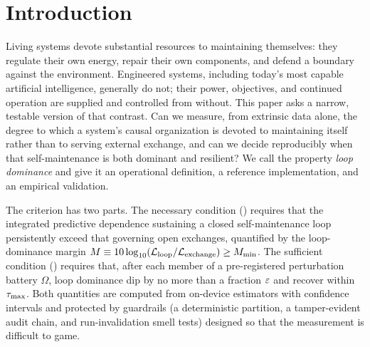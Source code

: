 \documentclass[11pt]{article}
\begin{document}
\begin{abstract}
These results establish loop dominance as a measurable, falsifiable property of a dynamical system and provide a tested, open instrument for evaluating it. The measure can be adopted on those terms alone. The criterion originated in the Loop-Dominance Theory of Consciousness (LDTC), the conjecture that this organization bears on the physical conditions for consciousness. That reading remains motivation rather than result; we treat it as an open interpretive question (), and nothing in this paper claims that any measured system is conscious. Code and data to reproduce every figure and table are released openly.
\end{abstract}

\section{Introduction}
\label{sec:intro}

Living systems devote substantial resources to maintaining themselves: they regulate their own energy, repair their own components, and defend a boundary against the environment. Engineered systems, including today's most capable artificial intelligence, generally do not; their power, objectives, and continued operation are supplied and controlled from without. This paper asks a narrow, testable version of that contrast. Can we measure, from extrinsic data alone, the degree to which a system's causal organization is devoted to maintaining itself rather than to serving external exchange, and can we decide reproducibly when that self-maintenance is both dominant and resilient? We call the property \emph{loop dominance} and give it an operational definition, a reference implementation, and an empirical validation.

The criterion has two parts. The necessary condition (\NC) requires that the integrated predictive dependence sustaining a closed self-maintenance loop persistently exceed that governing open exchanges, quantified by the loop-dominance margin $M \equiv 10\log_{10}(\mathcal{L}_{\text{loop}}/\mathcal{L}_{\text{exchange}}) \geq M_{\min}$. The sufficient condition (\SC) requires that, after each member of a pre-registered perturbation battery $\Omega$, loop dominance dip by no more than a fraction $\varepsilon$ and recover within $\tau_{\max}$. Both quantities are computed from on-device estimators with confidence intervals and protected by guardrails (a deterministic partition, a tamper-evident audit chain, and run-invalidation smell tests) designed so that the measurement is difficult to game.
\end{document}
